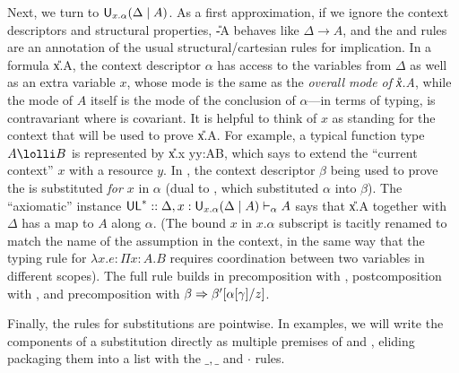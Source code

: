 Next, we turn to $\mathsf{U}_{x.\alpha}(\Delta \mid A)$.  As a first approximation,
if we ignore the context descriptors and structural properties,
\U{-}{\Delta}{A} behaves like $\Delta \to A$, and the \UL\/ and \UR\/
rules are an annotation of the usual structural/cartesian rules for
implication.  In a formula \U{x.\alpha}{\Delta}{A}, the context
descriptor $\alpha$ has access to the variables from $\Delta$ as well as
an extra variable $x$, whose mode is the same as the \emph{overall mode
  of \U{x.\alpha}{\Delta}{A}}, while the mode of $A$ itself is the mode
of the conclusion of $\alpha$---in terms of typing,  is
contravariant where  is covariant.  It is helpful to think of $x$
as standing for the context that will be used to prove
\U{x.\alpha}{\Delta}{A}.  For example, a typical function type $A \lolli
B$ is represented by \U{x.x \otimes y}{y:A}{B}, which says to extend the
``current context'' $x$ with a resource $y$.  In \UR, the context
descriptor $\beta$ being used to prove the  is substituted
\emph{for $x$} in $\alpha$ (dual to \FL, which substituted $\alpha$ into
$\beta$).  The ``axiomatic'' \UL\/ instance
$\mathsf{UL}^* :: {\Delta,x:\mathsf{U}_{x.\alpha}(\Delta \mid A) \vdash_{\alpha} A}$
says that \U{x.\alpha}{\Delta}{A} together with $\Delta$ has a map to
$A$ along $\alpha$.  (The bound $x$ in $x.\alpha$ subscript is tacitly
renamed to match the name of the assumption in the context, in the same
way that the typing rule for $\lambda x.e : \Pi x:A.B$ requires
coordination between two variables in different scopes).  The full rule
builds in precomposition with \seq{\Gamma}{\gamma}{\Delta},
postcomposition with , and precomposition
with $\beta \Rightarrow \beta'[\alpha[\gamma]/z]$.

Finally, the rules for substitutions are pointwise.  In examples, we
will write the components of a substitution directly as multiple
premises of \FR\/ and \UL\/, eliding packaging them into a list with the
$\_,\_$ and $\cdot$ rules.


